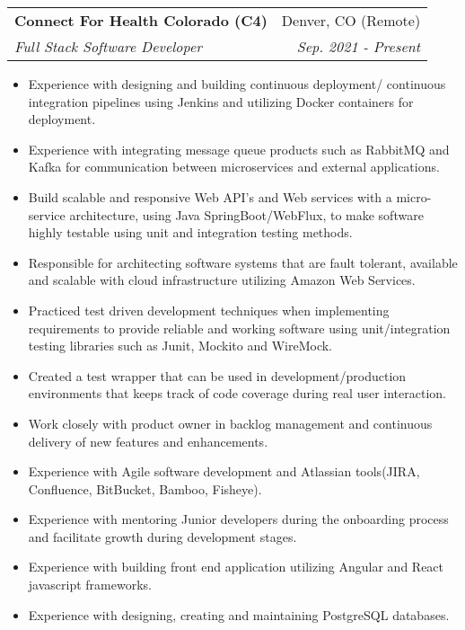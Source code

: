\documentclass[letterpaper,11pt]{article}
\makeatletter
\newcommand{\resumeItem}[2]{
  \item\small{
    \textbf{#1}{#2 \vspace{-2pt}}
  }
}
\newcommand{\resumeSubheading}[4]{
  \vspace{-1pt}\item
    \begin{tabular*}{0.97\textwidth}[t]{l@{\extracolsep{\fill}}r}
      \textbf{#1} & #2 \\
      \textit{\small#3} & \textit{\small #4} \\
    \end{tabular*}\vspace{-5pt}
}
\newcommand{\resumeItemListStart}{\begin{itemize}}
\newcommand{\resumeItemListEnd}{\end{itemize}\vspace{-5pt}}
\makeatother
\begin{document}
    \resumeSubheading
      {Connect For Health Colorado (C4)}{Denver, CO (Remote)}
      {Full Stack Software Developer}{Sep. 2021 - Present}
      \resumeItemListStart
        \resumeItem{}
          {Experience with designing and building continuous deployment/ continuous integration pipelines using Jenkins and utilizing Docker containers for deployment.}
        \resumeItem{}
          {Experience with integrating message queue products such as RabbitMQ and Kafka for communication between microservices and external applications.}
        \resumeItem{}
          {Build scalable and responsive Web API’s and Web services with a micro-service architecture, using Java SpringBoot/WebFlux, to make software highly testable using unit and integration testing methods.}
        \resumeItem{}
          {Responsible for architecting software systems that are fault tolerant, available and scalable with cloud infrastructure utilizing Amazon Web Services.}
        \resumeItem{}
          {Practiced test driven development techniques when implementing requirements to provide reliable and working software using unit/integration testing libraries such as Junit, Mockito and WireMock.}
        \resumeItem{}
          {Created a test wrapper that can be used in development/production environments that keeps track of code coverage during real user interaction.}
        \resumeItem{}
          {Work closely with product owner in backlog management and continuous delivery of new features and enhancements.}
        \resumeItem{}
          {Experience with Agile software development and Atlassian tools(JIRA, Confluence, BitBucket, Bamboo, Fisheye).}
        \resumeItem{}
          {Experience with mentoring Junior developers during the onboarding process and facilitate growth during development stages.}
        \resumeItem{}
          {Experience with building front end application utilizing Angular and React javascript frameworks.}
        \resumeItem{}
          {Experience with designing, creating and maintaining PostgreSQL databases.}
      \resumeItemListEnd
\end{document}

